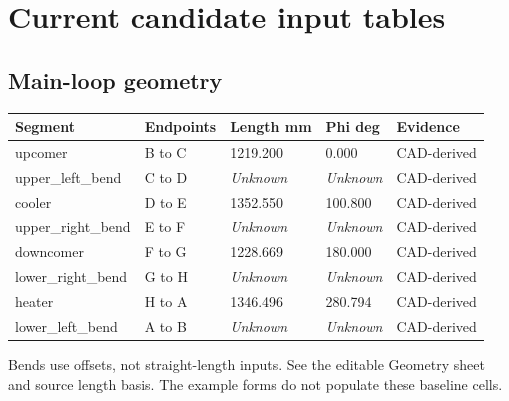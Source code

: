 \documentclass[11pt]{article}
\begin{document}
\begin{center}
{
}\end{center}
\clearpage\section{Current candidate input tables}
\subsection*{Main-loop geometry}
\small\setlength{\tabcolsep}{4pt}
\begin{longtable}{p{}p{}p{}p{}p{}}
\toprule
\textbf{Segment} & \textbf{Endpoints} & \textbf{Length mm} & \textbf{Phi deg} & \textbf{Evidence} \\\midrule\endhead
upcomer & B to C & 1219.200 & 0.000 & CAD-derived \\[3pt]
upper\_left\_bend & C to D & \textit{Unknown} & \textit{Unknown} & CAD-derived \\[3pt]
cooler & D to E & 1352.550 & 100.800 & CAD-derived \\[3pt]
upper\_right\_bend & E to F & \textit{Unknown} & \textit{Unknown} & CAD-derived \\[3pt]
downcomer & F to G & 1228.669 & 180.000 & CAD-derived \\[3pt]
lower\_right\_bend & G to H & \textit{Unknown} & \textit{Unknown} & CAD-derived \\[3pt]
heater & H to A & 1346.496 & 280.794 & CAD-derived \\[3pt]
lower\_left\_bend & A to B & \textit{Unknown} & \textit{Unknown} & CAD-derived \\[3pt]
\bottomrule\end{longtable}\normalsize
Bends use offsets, not straight-length inputs. See the editable Geometry sheet and source length basis. The example forms do not populate these baseline cells.
\end{document}
